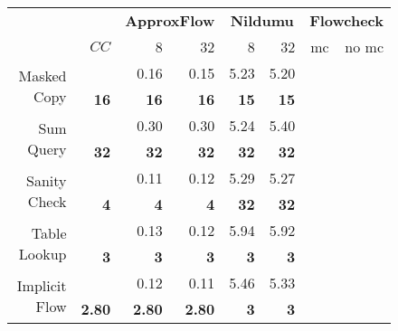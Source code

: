 \begin{figure}
\begin{table}[H]
\begin{tabular}{rr|rr|rr|rr}
                                      & \textbf{}     & \multicolumn{2}{c|}{\textbf{ApproxFlow}}                 & \multicolumn{2}{c|}{\textbf{Nildumu}} & \multicolumn{2}{c}{\textbf{Flowcheck}} \\
                                      & $CC$          & 8                      & 32                     & 8             & 32           & mc             & no mc         \\ \hline
\multirow{2}{*}{Masked Copy}          &               & 0.16                   & 0.15                   & 5.23          & 5.20         &                &               \\
                                      & \textbf{16}   & \textbf{16}            & \textbf{16}            & \textbf{15}   & \textbf{15}  & \textbf{}      & \textbf{}     \\ \hline
\multirow{2}{*}{Sum Query}            &               & 0.30                   & 0.30                   & 5.24          & 5.40         &                &               \\
                                      & \textbf{32}   & \textbf{32}            & \textbf{32}            & \textbf{32}   & \textbf{32}  &                &               \\ \hline
\multirow{2}{*}{Sanity Check}         &               & 0.11                   & 0.12                   & 5.29          & 5.27         &                &               \\
                                      & \textbf{4}    & \textbf{4}             & \textbf{4}             & \textbf{32}   & \textbf{32}  &                &               \\ \hline
\multirow{2}{*}{Table Lookup}         &               & 0.13                   & 0.12                   & 5.94          & 5.92         &                &               \\
                                      & \textbf{3}    & \textbf{3}             & \textbf{3}             & \textbf{3}    & \textbf{3}   &                &               \\ \hline
\multirow{2}{*}{Implicit Flow}        &               & 0.12                   & 0.11                   & 5.46          & 5.33         &                &               \\
                                      & \textbf{2.80} & \textbf{2.80}          & \textbf{2.80}          & \textbf{3}    & \textbf{3}   &                &               \\ \hline\hline

\end{tabular}
\end{table}
\end{figure}
